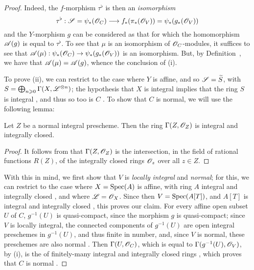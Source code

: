 \begin{proof}
Indeed, the $f$-morphism $\tau^\flat$ is then an \emph{isomorphism}
\[
  \tau^\flat:\sh{S}=\psi_*(\sh{O}_C)\to f_*(\pi_*(\sh{O}_V))=\psi_*(g_*(\sh{O}_V))
\]
and the $Y$-morphism $g$ can be considered as that for which the homomorphism $\mathscr{A}(g)$  is equal to $\tau^\flat$.
To see that $\mu$ is an isomorphism of $\mathscr{O}_C$-modules, it suffices  to see that $\sh{A}(\mu):\psi_*(\sh{O}_C)\to\psi_*(g_*(\sh{O}_V))$ is an isomorphism.
But, by Definition~, we have that $\mathscr{A}(\mu)=\mathscr{A}(g)$, whence the conclusion of (i).

To prove (ii), we can restrict to the case where $Y$ is affine, and so $\mathscr{S}=\widetilde{S}$, with
$S=\bigoplus_{n\geqslant0}\Gamma(X,\mathscr{L}^{\otimes n})$;
the hypothesis that $X$ is integral implies that the ring $S$ is integral , and thus so too is $C$ .
To show that $C$ is normal, we will use the following lemma:

\begin{lemma}[8.8.6.1]
\label{II.8.8.6.1}
Let $Z$ be a normal integral prescheme.
Then the ring $\Gamma(Z,\mathscr{O}_Z)$ is integral and integrally closed.
\end{lemma}

\begin{proof}
It follows from  that $\Gamma(Z,\mathscr{O}_Z)$ is the intersection, in the field of rational functions $R(Z)$, of the integrally closed rings $\mathscr{O}_z$ over all $z\in Z$.
\end{proof}

With this in mind, we first show that $V$ is \emph{locally integral} and \emph{normal};
for this, we can restrict to the case where $X=\operatorname{Spec}(A)$ is affine, with ring $A$ integral and integrally closed , and where $\mathscr{L}=\mathscr{O}_X$.
Since then $V=\operatorname{Spec}(A[T])$, and $A[T]$ is integral and integrally closed \cite[p.~99]{II-24}, this proves our claim.
For every affine open subset $U$ of $C$, $g^{-1}(U)$ is quasi-compact, since the morphism $g$ is quasi-compact;
since $V$ is locally integral, the connected components of $g^{-1}(U)$ are open integral preschemes in $g^{-1}(U)$, and thus finite in number, and, since $V$ is normal, these preschemes are also normal .
Then $\Gamma(U,\mathscr{O}_C)$, which is equal to $\Gamma(g^{-1}(U),\mathscr{O}_V)$, by (i), is the  of finitely-many integral and integrally closed rings , which proves that $C$ is normal .
\end{proof}

